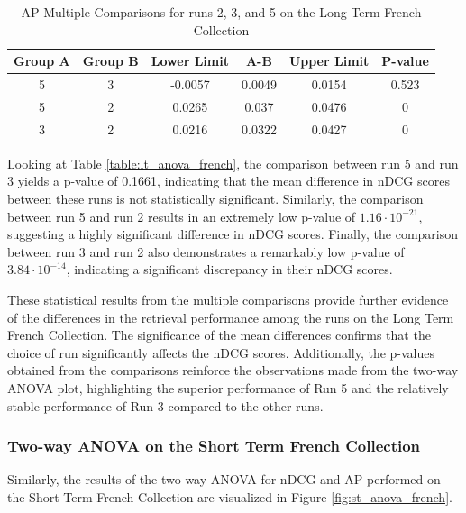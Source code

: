 \begin{table}[!h]
    \centering
    \caption{\ac{AP} Multiple Comparisons for runs 2, 3, and 5 on the Long Term French Collection}
    \label{table:lt_anova_french_ap}
    \begin{tabular}{cccccc}
    \hline
    Group A & Group B & Lower Limit & A-B & Upper Limit & P-value \\ \hline
    5 & 3 & -0.0057 & 0.0049 & 0.0154 & 0.523 \\
    5 & 2 & 0.0265 & 0.037 & 0.0476 & 0 \\
    3 & 2 & 0.0216 & 0.0322 & 0.0427 & 0 \\ \hline
    \end{tabular}
\end{table}

Looking at Table \ref{table:lt_anova_french}, the comparison between run 5 and run 3 yields a p-value of 0.1661, indicating that the mean difference in \ac{nDCG} scores between these runs is not statistically significant. 
Similarly, the comparison between run 5 and run 2 results in an extremely low p-value of $1.16 \cdot 10^{-21}$, suggesting a highly significant difference in \ac{nDCG} scores. 
Finally, the comparison between run 3 and run 2 also demonstrates a remarkably low p-value of $3.84 \cdot 10^{-14}$, indicating a significant discrepancy in their \ac{nDCG} scores.

These statistical results from the multiple comparisons provide further evidence of the differences in the retrieval performance among the runs on the Long Term French Collection. 
The significance of the mean differences confirms that the choice of run significantly affects the \ac{nDCG} scores. 
Additionally, the p-values obtained from the comparisons reinforce the observations made from the two-way \ac{ANOVA} plot, highlighting the superior performance of Run 5 and the relatively stable performance of Run 3 compared to the other runs.

\newpage
\enlargethispage{10\baselineskip}
\subsubsection{Two-way ANOVA on the Short Term French Collection}

Similarly, the results of the two-way \ac{ANOVA} for \ac{nDCG} and \ac{AP} performed on the Short Term French Collection are visualized in Figure \ref{fig:st_anova_french}. 

